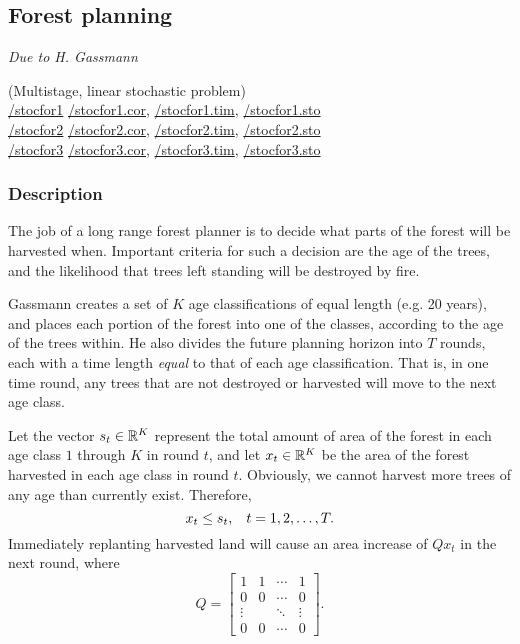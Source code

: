 \subsection{Forest planning}%
\emph{Due to H. Gassmann  \cite{gassmann89}}%

\noindent(Multistage, linear stochastic problem) \\
\noindent \url{/stocfor1} \url{/stocfor1.cor}, \url{/stocfor1.tim}, \url{/stocfor1.sto}\\
\noindent \url{/stocfor2} \url{/stocfor2.cor}, \url{/stocfor2.tim}, \url{/stocfor2.sto}\\
\noindent \url{/stocfor3} \url{/stocfor3.cor}, \url{/stocfor3.tim}, \url{/stocfor3.sto}

\vspace{3mm}
\subsubsection{Description}

The job of a long range forest planner is to decide what parts of the forest will be harvested when.  Important criteria for such a decision are the age of the trees, and the likelihood that trees left standing will be destroyed by fire.

Gassmann \cite{gassmann89} creates a set of $K$ age classifications of equal length (e.g. 20 years), and places each portion of the forest into one of the classes, according to the age of the trees within.  He also divides the future planning horizon into $T$ rounds, each with a time length \emph{equal} to that of each age classification.  That is, in one time round, any trees that are not destroyed or harvested will move to the next age class.  

Let the vector $s_t \in {\mathbb R}^K$ represent the total amount of area of the forest in each age class $1$ through $K$ in round $t$, and let $x_t \in {\mathbb R}^K$ be the area of the forest harvested in each age class in round $t$.  Obviously, we cannot harvest more trees of any age than currently exist.  Therefore,
\begin{equation}
\label{FOREST:cutlimits}
x_t \leq s_t, \hspace{3mm} t=1,2,\ldots,T.
\end{equation}
Immediately replanting harvested land will cause an area increase of $Qx_t$ in the next round, where
\[
Q = \left[\begin{array}{cccc}
	1&1&\cdots&1\\
	0&0&\cdots&0\\
	\vdots&&\ddots&\vdots\\
	0&0&\cdots&0
	\end{array}\right].
\]


